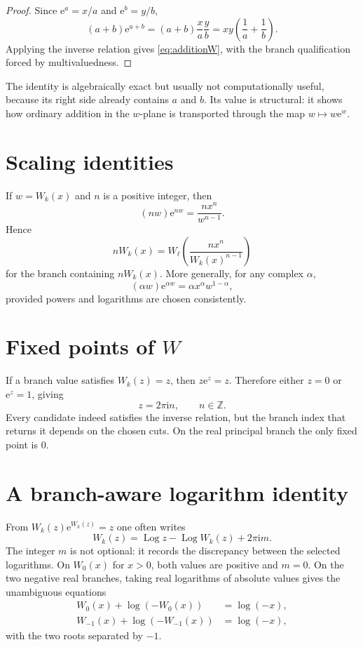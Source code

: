 \documentclass[11pt,oneside]{book}
\theoremstyle{definition}
\theoremstyle{remark}
\newcommand{\ee}{\mathrm e}
\newcommand{\ii}{\mathrm i}
\newcommand{\Log}{\operatorname{Log}}
\newcommand{\Z}{\mathbb Z}
\begin{document}
\begin{proof}
Since $\ee^a=x/a$ and $\ee^b=y/b$,
\[
 (a+b)\ee^{a+b}
 =(a+b)\frac{x}{a}\frac{y}{b}
 =xy\left(\frac1a+\frac1b\right).
\]
Applying the inverse relation gives \eqref{eq:additionW}, with the branch
qualification forced by multivaluedness.
\end{proof}

The identity is algebraically exact but usually not computationally useful,
because its right side already contains $a$ and $b$.  Its value is structural:
it shows how ordinary addition in the $w$-plane is transported through the
map $w\mapsto w\ee^w$.

\section{Scaling identities}

If $w=W_k(x)$ and $n$ is a positive integer, then
\begin{equation}\label{eq:scalingidentity}
 (nw)\ee^{nw}=\frac{n x^n}{w^{n-1}}.
\end{equation}
Hence
\begin{equation}\label{eq:scalingW}
 nW_k(x)=W_\ell\!\left(
 \frac{n x^n}{W_k(x)^{n-1}}
 \right)
\end{equation}
for the branch containing $nW_k(x)$.  More generally, for any complex
$\alpha$,
\[
 (\alpha w)\ee^{\alpha w}
 =\alpha x^\alpha w^{1-\alpha},
\]
provided powers and logarithms are chosen consistently.

\section{Fixed points of $W$}

If a branch value satisfies $W_k(z)=z$, then
$z\ee^z=z$.  Therefore either $z=0$ or $\ee^z=1$, giving
\begin{equation}\label{eq:Wfixedcandidates}
 z=2\pi\ii n,
 \qquad n\in\Z.
\end{equation}
Every candidate indeed satisfies the inverse relation, but the branch index
that returns it depends on the chosen cuts.  On the real principal branch the
only fixed point is $0$.

\section{A branch-aware logarithm identity}

From $W_k(z)\ee^{W_k(z)}=z$ one often writes
\begin{equation}\label{eq:logidentity}
 W_k(z)=\Log z-\Log W_k(z)+2\pi\ii m.
\end{equation}
The integer $m$ is not optional: it records the discrepancy between the
selected logarithms.  On $W_0(x)$ for $x>0$, both values are positive and
$m=0$.  On the two negative real branches, taking real logarithms of absolute
values gives the unambiguous equations
\begin{align}
 W_0(x)+\log(-W_0(x))&=\log(-x),\\
 W_{-1}(x)+\log(-W_{-1}(x))&=\log(-x),
\end{align}
with the two roots separated by $-1$.
\end{document}
